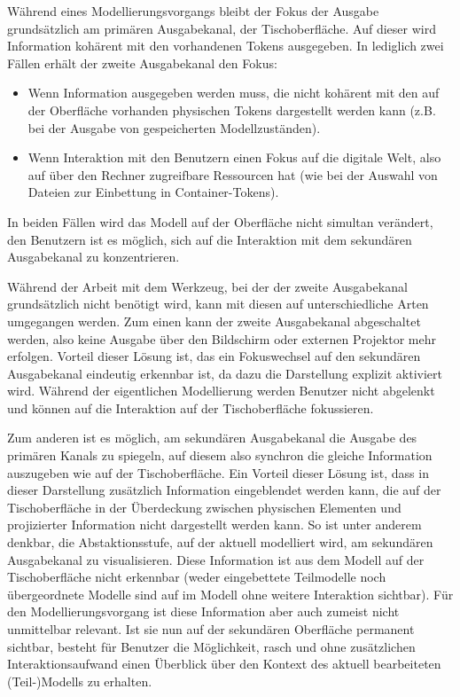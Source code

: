 Während eines Modellierungsvorgangs bleibt der Fokus der Ausgabe grundsätzlich am primären Ausgabekanal, der Tischoberfläche. Auf dieser wird Information kohärent mit den vorhandenen Tokens ausgegeben. In lediglich zwei Fällen erhält der zweite Ausgabekanal den Fokus:
\begin{itemize}
 \item Wenn Information ausgegeben werden muss, die nicht kohärent mit den auf der Oberfläche vorhanden physischen Tokens dargestellt werden kann (z.B. bei der Ausgabe von gespeicherten Modellzuständen).
 \item Wenn Interaktion mit den Benutzern einen Fokus auf die digitale Welt, also auf über den Rechner zugreifbare Ressourcen hat (wie bei der Auswahl von Dateien zur Einbettung in Container-Tokens).
\end{itemize}
In beiden Fällen wird das Modell auf der Oberfläche nicht simultan verändert, den Benutzern ist es möglich, sich auf die Interaktion mit dem sekundären Ausgabekanal zu konzentrieren.

Während der Arbeit mit dem Werkzeug, bei der der zweite Ausgabekanal grundsätzlich nicht benötigt wird, kann mit diesen auf unterschiedliche Arten umgegangen werden. Zum einen kann der zweite Ausgabekanal abgeschaltet werden, also keine Ausgabe über den Bildschirm oder externen Projektor mehr erfolgen. Vorteil dieser Lösung ist, das ein Fokuswechsel auf den sekundären Ausgabekanal eindeutig erkennbar ist, da dazu die Darstellung explizit aktiviert wird. Während der eigentlichen Modellierung werden Benutzer nicht abgelenkt und können auf die Interaktion auf der Tischoberfläche fokussieren.

Zum anderen ist es möglich, am sekundären Ausgabekanal die Ausgabe des primären Kanals zu spiegeln, auf diesem also synchron die gleiche Information auszugeben wie auf der Tischoberfläche. Ein Vorteil dieser Lösung ist, dass in dieser Darstellung zusätzlich Information eingeblendet werden kann, die auf der Tischoberfläche in der Überdeckung zwischen physischen Elementen und projizierter Information nicht dargestellt werden kann. So ist unter anderem denkbar, die Abstaktionsstufe, auf der aktuell modelliert wird, am sekundären Ausgabekanal zu visualisieren. Diese Information ist aus dem Modell auf der Tischoberfläche nicht erkennbar (weder eingebettete Teilmodelle noch übergeordnete Modelle sind auf im Modell ohne weitere Interaktion sichtbar). Für den Modellierungsvorgang ist diese Information aber auch zumeist nicht unmittelbar relevant. Ist sie nun auf der sekundären Oberfläche permanent sichtbar, besteht für Benutzer die Möglichkeit, rasch und ohne zusätzlichen Interaktionsaufwand einen Überblick über den Kontext des aktuell bearbeiteten (Teil-)Modells zu erhalten.

